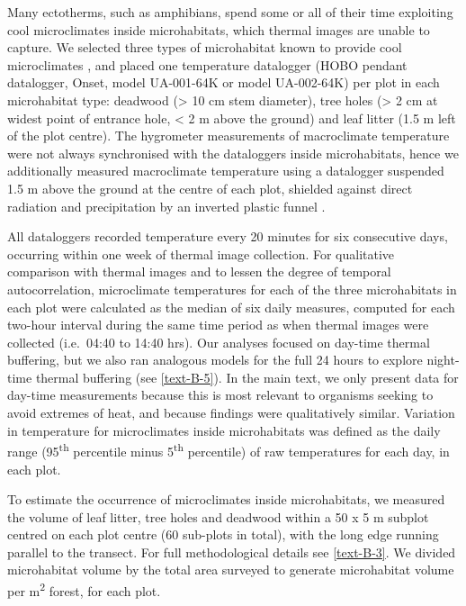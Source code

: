 \documentclass[12pt,a4paper,]{report}
\theoremstyle{definition}
\theoremstyle{definition}
\theoremstyle{definition}
\theoremstyle{remark}
\begin{document}
Many ectotherms, such as amphibians, spend some or all of their time
exploiting cool microclimates inside microhabitats, which thermal images
are unable to capture. We selected three types of microhabitat known to
provide cool microclimates
\citep{scheffers_microhabitats_2014, scheffers_microhabitats_2014-1, gonzalez_del_pliego_thermally_2016},
and placed one temperature datalogger (HOBO pendant datalogger, Onset,
model UA-001-64K or model UA-002-64K) per plot in each microhabitat
type: deadwood (\textgreater{} 10 cm stem diameter), tree holes
(\textgreater{} 2 cm at widest point of entrance hole, \textless{} 2 m
above the ground) and leaf litter (1.5 m left of the plot centre). The
hygrometer measurements of macroclimate temperature were not always
synchronised with the dataloggers inside microhabitats, hence we
additionally measured macroclimate temperature using a datalogger
suspended 1.5 m above the ground at the centre of each plot, shielded
against direct radiation and precipitation by an inverted plastic funnel
\citep{shoo_potential_2010, scheffers_microhabitats_2014-1}.

All dataloggers recorded temperature every 20 minutes for six
consecutive days, occurring within one week of thermal image collection.
For qualitative comparison with thermal images and to lessen the degree
of temporal autocorrelation, microclimate temperatures for each of the
three microhabitats in each plot were calculated as the median of six
daily measures, computed for each two-hour interval during the same time
period as when thermal images were collected (i.e.~04:40 to 14:40 hrs).
Our analyses focused on day-time thermal buffering, but we also ran
analogous models for the full 24 hours to explore night-time thermal
buffering (see \autoref{text-B-5}). In the main text, we only present
data for day-time measurements because this is most relevant to
organisms seeking to avoid extremes of heat, and because findings were
qualitatively similar. Variation in temperature for microclimates inside
microhabitats was defined as the daily range (95\textsuperscript{th}
percentile minus 5\textsuperscript{th} percentile) of raw temperatures
for each day, in each plot.

To estimate the occurrence of microclimates inside microhabitats, we
measured the volume of leaf litter, tree holes and deadwood within a 50
x 5 m subplot centred on each plot centre (60 sub-plots in total), with
the long edge running parallel to the transect. For full methodological
details see \autoref{text-B-3}. We divided microhabitat volume by the
total area surveyed to generate microhabitat volume per
m\textsuperscript{2} forest, for each plot.
\end{document}

